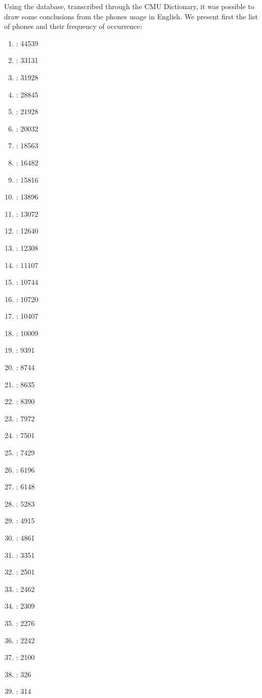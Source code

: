 Using the database, transcribed through the CMU Dictionary, it was possible to draw 
some conclusions from the phones usage in English. We present first the list of phones 
and their frequency of occurrence:
\begin{tiny}
\begin{multicols}{4}
\begin{enumerate}
    \item {} : 44539 
	\item {} : 33131 
	\item {} : 31928 
	\item {} : 28845 
	\item {} : 21928 
	\item {} : 20032 
	\item {} : 18563 
	\item {} : 16482 
	\item {} : 15816 
	\item {} : 13896 
	\item {} : 13072 
	\item \textipa{3\textrhoticity} : 12640 
	\item {} : 12308 
	\item {} : 11107 
	\item {} : 10744 
	\item {} : 10720 
	\item {} : 10407 
	\item {} : 10009 
	\item {} : 9391 
	\item {} : 8744 
	\item \textipa{\ae} : 8635 
	\item {} : 8390 
	\item {} : 7972 
	\item {} : 7501 
	\item {} : 7429 
	\item {} : 6196 
	\item {} : 6148 
	\item {} : 5283 
	\item {} : 4915 
	\item {} : 4861 
	\item {} : 3351 
	\item {} : 2501 
	\item {} : 2462 
	\item {} : 2309 
	\item {} : 2276 
	\item {} : 2242 
	\item {} : 2100 
	\item {} : 326 
	\item {} : 314 
\end{enumerate}
\end{multicols}
\end{tiny}
